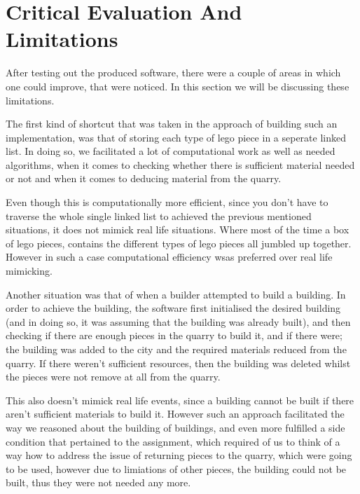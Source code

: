 \documentclass[12pt, A4]{report}
\begin{document}
	\section*{Critical Evaluation And Limitations}
	After testing out the produced software, there were a couple of areas in which one could improve, that were noticed.
	In this section we will be discussing these limitations.

	\par
	The first kind of shortcut that was taken in the approach of building such an implementation, was that of storing each type of lego piece in a seperate linked list. In doing so, we facilitated a lot of computational work as well as needed algorithms, when it comes to checking whether there is sufficient material needed or not and when it comes to deducing material from the quarry. 

	\par
	Even though this is computationally more efficient, since you don't have to traverse the whole single linked list to achieved the previous mentioned situations, it does not mimick real life situations. Where most of the time a box of lego pieces, contains the different types of lego pieces all jumbled up together. However in such a case computational efficiency wsas preferred over real life mimicking.

	\par
	Another situation was that of when a builder attempted to build a building. In order to achieve the building, the software first initialised the desired building (and in doing so, it was assuming that the building was already built), and then checking if there are enough pieces in the quarry to build it, and if there were; the building was added to the city and the required materials reduced from the quarry. If there weren't sufficient resources, then the building was deleted whilst the pieces were not remove at all from the quarry. 

	\par
	This also doesn't mimick real life events, since a building cannot be built if there aren't sufficient materials to build it. However such an approach facilitated the way we reasoned about the building of buildings, and even more fulfilled a side condition that pertained to the assignment, which required of us to think of a way how to address the issue of returning pieces to the quarry, which were going to be used, however due to limiations of other pieces, the building could not be built, thus they were not needed any more.
\end{document}
